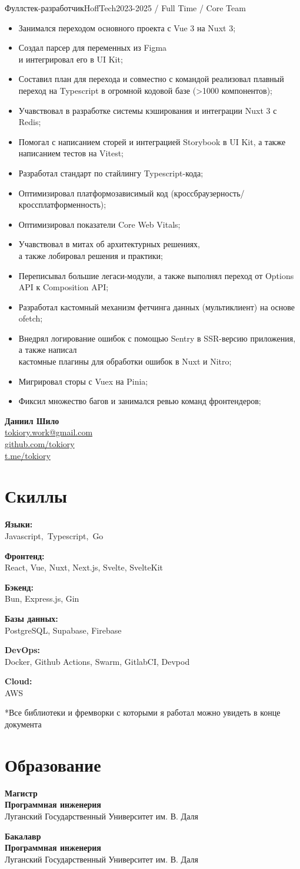 \documentclass[a4paper,12pt]{article}
\makeatletter
\newcommand{\educationEntry}[4]{%
  \begin{raggedright}
    \textbf{#1}\\
    \textbf{#2}\\
    #3\\
  \end{raggedright}
  \vspace*{0.75em}
}
\newcommand{\SkillGroup}[2]{%
  \RaggedRight
  \textbf{#1:}\\ #2\\
  \vspace*{0.4em}
}
\newenvironment{nohyphens}{%
  \begingroup\hyphenpenalty=10000\exhyphenpenalty=10000\sloppy
}{%
  \endgroup
}
\newcommand{\rc}[0]{
\begin{minipage}[t]{0.33\textwidth}
  \begin{flushright}
    {\LARGE \textbf{Даниил Шило}}\\
    \vspace*{0.5em}
    \href{mailto:tokiory.work@gmail.com}{tokiory.work@gmail.com}\\
    \href{https://github.com/tokiory}{github.com/tokiory}\\
    \href{https://t.me/tokiory}{t.me/tokiory}\\
    \vspace*{1em}
  \end{flushright}

  \section*{Скиллы}
  \begin{nohyphens}
    \SkillGroup{Языки}{\mbox{Javascript, Typescript, Go}}
    \SkillGroup{Фронтенд}{React, Vue, Nuxt, Next.js, Svelte, SvelteKit}
    \SkillGroup{Бэкенд}{Bun, Express.js, Gin}
    \SkillGroup{Базы данных}{PostgreSQL, Supabase, Firebase}
    \SkillGroup{DevOps}{Docker, Github Actions, Swarm, GitlabCI, Devpod}
    \SkillGroup{Cloud}{AWS}
  \end{nohyphens}
  *Все библиотеки и фремворки с которыми я работал можно увидеть в конце документа


  \section*{Образование}
  \educationEntry{Магистр}{Программная инженерия}{Луганский Государственный Университет им. В. Даля}{2023 -- 2025}
  \educationEntry{Бакалавр}{Программная инженерия}{Луганский Государственный Университет им. В. Даля}{2019 -- 2023}

\end{minipage}
}
\makeatother
\begin{document}
\begin{minipage}[t]{0.62\textwidth}
  \begin{ExperienceBlock}{Фуллстек-разработчик}{HoffTech}{2023-2025 / Full Time / Core Team}
    \begin{itemize}[leftmargin=*]
      \item Занимался переходом основного проекта с Vue 3 на Nuxt 3;
      \item Создал парсер для переменных из Figma\\ и интегрировал его в UI Kit;
      \item Составил план для перехода и совместно с командой реализовал плавный переход на Typescript в огромной кодовой базе (\textgreater1000 компонентов);
      \item Учавствовал в разработке системы кэширования и интеграции Nuxt 3 с Redis;
      \item Помогал с написанием сторей и интеграцией Storybook в UI Kit, а также написанием тестов на Vitest;
      \item Разработал стандарт по стайлингу Typescript-кода;
      \item Оптимизировал платформозависимый код (кроссбраузерность/кроссплатформенность);
      \item Оптимизировал показатели Core Web Vitals;
      \item Учавствовал в митах об архитектурных решениях,\\а также лобировал решения и практики;
      \item Переписывал большие легаси-модули, а также выполнял переход от Options API к Composition API;
      \item Разработал кастомный механизм фетчинга данных (мультиклиент) на основе ofetch;
      \item Внедрял логирование ошибок с помощью Sentry в SSR-версию приложения, а также написал \\кастомные плагины для обработки ошибок в Nuxt и Nitro;
      \item Мигрировал сторы с Vuex на Pinia;
          \item Фиксил множество багов и занимался ревью команд фронтендеров;
    \end{itemize}
  \end{ExperienceBlock}
\end{minipage}
\hfill
\rc
\end{document}
